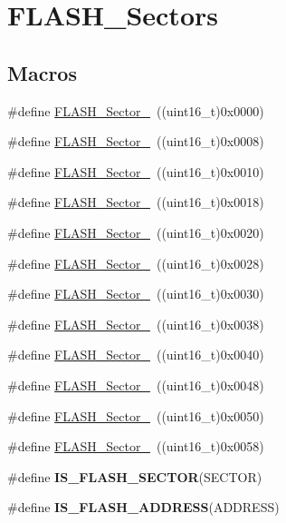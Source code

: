 \hypertarget{group___f_l_a_s_h___sectors}{\section{F\-L\-A\-S\-H\-\_\-\-Sectors}
\label{group___f_l_a_s_h___sectors}
}
\subsection*{Macros}
\begin{DoxyCompactItemize}
\item 
\#define \hyperlink{group___f_l_a_s_h___sectors_gac0f2d85ff047a3bf5dcdcd275e488796}{F\-L\-A\-S\-H\-\_\-\-Sector\-\_}~((uint16\-\_\-t)0x0000)
\item 
\#define \hyperlink{group___f_l_a_s_h___sectors_ga64fa0a3c29717df67d2fa827cc316faa}{F\-L\-A\-S\-H\-\_\-\-Sector\-\_}~((uint16\-\_\-t)0x0008)
\item 
\#define \hyperlink{group___f_l_a_s_h___sectors_ga9c5458f70e420e0715a7f268aff38fc1}{F\-L\-A\-S\-H\-\_\-\-Sector\-\_}~((uint16\-\_\-t)0x0010)
\item 
\#define \hyperlink{group___f_l_a_s_h___sectors_ga64cfe33ec785060ce70034df6534a656}{F\-L\-A\-S\-H\-\_\-\-Sector\-\_}~((uint16\-\_\-t)0x0018)
\item 
\#define \hyperlink{group___f_l_a_s_h___sectors_ga389be89b2f79824cc2682a25297adf4a}{F\-L\-A\-S\-H\-\_\-\-Sector\-\_}~((uint16\-\_\-t)0x0020)
\item 
\#define \hyperlink{group___f_l_a_s_h___sectors_ga79028613994f20106c3fc2dfd56d8085}{F\-L\-A\-S\-H\-\_\-\-Sector\-\_}~((uint16\-\_\-t)0x0028)
\item 
\#define \hyperlink{group___f_l_a_s_h___sectors_gadeda2fce59d9ee17d7cc1025d1b6352d}{F\-L\-A\-S\-H\-\_\-\-Sector\-\_}~((uint16\-\_\-t)0x0030)
\item 
\#define \hyperlink{group___f_l_a_s_h___sectors_ga143c0665510327a7ec97052e6d6bb53a}{F\-L\-A\-S\-H\-\_\-\-Sector\-\_}~((uint16\-\_\-t)0x0038)
\item 
\#define \hyperlink{group___f_l_a_s_h___sectors_ga27a8e02b4fcfe7863a95f38a78ca52a6}{F\-L\-A\-S\-H\-\_\-\-Sector\-\_}~((uint16\-\_\-t)0x0040)
\item 
\#define \hyperlink{group___f_l_a_s_h___sectors_ga717c6135a9ed6aa633796faf695fc2cd}{F\-L\-A\-S\-H\-\_\-\-Sector\-\_}~((uint16\-\_\-t)0x0048)
\item 
\#define \hyperlink{group___f_l_a_s_h___sectors_ga0f9450aee4976ecf4f0ba2fbcf2555be}{F\-L\-A\-S\-H\-\_\-\-Sector\-\_}~((uint16\-\_\-t)0x0050)
\item 
\#define \hyperlink{group___f_l_a_s_h___sectors_gaac431a84bd33c70626b7981dcaf123b1}{F\-L\-A\-S\-H\-\_\-\-Sector\-\_}~((uint16\-\_\-t)0x0058)
\item 
\#define {\bfseries I\-S\-\_\-\-F\-L\-A\-S\-H\-\_\-\-S\-E\-C\-T\-O\-R}(S\-E\-C\-T\-O\-R)
\item 
\#define {\bfseries I\-S\-\_\-\-F\-L\-A\-S\-H\-\_\-\-A\-D\-D\-R\-E\-S\-S}(A\-D\-D\-R\-E\-S\-S)
\end{DoxyCompactItemize}


